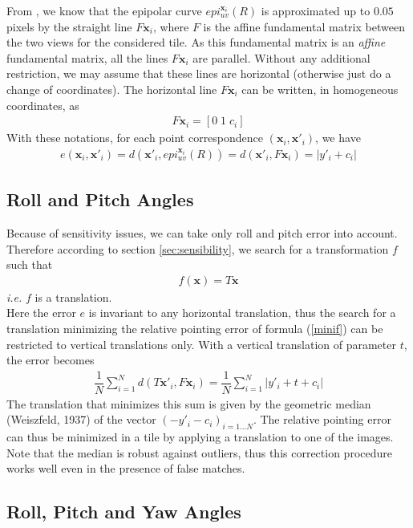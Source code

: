 \documentclass[paper=a4, fontsize=11pt]{article}
\begin{document}
From  \cite{de2014automatic}, we know that the epipolar curve $epi^{\textbf{x}_i}_{u v}(R)$ is approximated up to $0.05$ pixels by the straight line $F\textbf{x}_i$, where $F$ is
the affine fundamental matrix between the two views for the considered tile. As this fundamental matrix is an \textit{affine} fundamental matrix, all the lines $F\textbf{x}_i$ are parallel. Without any additional restriction, we may assume that these lines are horizontal (otherwise just do a change of coordinates). The horizontal line $F\textbf{x}_i$ can be written, in homogeneous coordinates, as
\begin{align*}
F\textbf{x}_i = \left[ 0 \; 1 \; c_i \right]
\end{align*}
With these notations, for each point correspondence $(\textbf{x}_i , \textbf{x}'_i)$, we have
\begin{align*}
e(\textbf{x}_i, \textbf{x}'_i) = d(\textbf{x}'_i, epi^{\textbf{x}_i}_{u v}(R)) = d(\textbf{x}'_i, F\textbf{x}_i) = | y'_i + c_i|
\end{align*}

\subsection{Roll and Pitch Angles}
Because of sensitivity issues, we can take only roll and pitch error into account. Therefore according to section \ref{sec:sensibility}, we search for a transformation $f$ such that
\begin{align*}
f(\textbf{x}) = T\textbf{x}
\end{align*}
\textit{i.e.} $f$ is a translation.\\
Here the error $e$ is invariant to any horizontal translation, thus the search for a translation minimizing the relative pointing error of formula (\ref{minif}) can be restricted to vertical translations only. With a vertical translation of parameter $t$, the error becomes
\begin{align*}
\dfrac{1}{N} \sum\limits_{i=1}^{N} d(T\textbf{x}'_i, F\textbf{x}_i) = \dfrac{1}{N} \sum\limits_{i=1}^{N} | y'_i + t+ c_i|
\end{align*}
The translation that minimizes this sum is given by the geometric median (Weiszfeld, 1937) of the vector $(-y'_i - c_i )_{i=1...N}$.  The relative pointing error can thus be minimized in a tile by applying a translation to one of the images. Note that the median is robust against outliers, thus this correction procedure works well even in the presence of false matches.

\subsection{Roll, Pitch and Yaw Angles}



\end{document}
